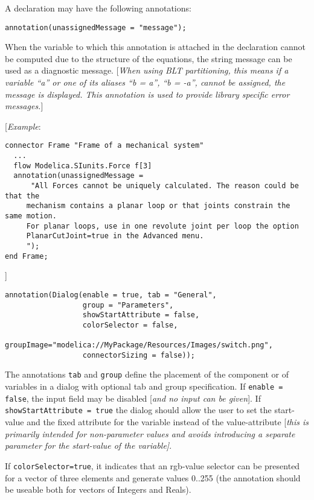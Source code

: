 A declaration may have the following annotations:
\begin{lstlisting}[language=modelica]
  annotation(unassignedMessage = "message");
\end{lstlisting}

When the variable to which this annotation is attached in the
declaration cannot be computed due to the structure of the equations,
the string message can be used as a diagnostic message. {[}\emph{When
using BLT partitioning, this means if a variable ``a'' or one of its
aliases ``b = a'', ``b = -a'', cannot be assigned, the message is
displayed. This annotation is used to provide library specific error
messages.}{]}

{[}\emph{Example}:

\begin{lstlisting}[language=modelica]
connector Frame "Frame of a mechanical system"
  ...
  flow Modelica.SIunits.Force f[3]
  annotation(unassignedMessage =
      "All Forces cannot be uniquely calculated. The reason could be that the
     mechanism contains a planar loop or that joints constrain the same motion.
     For planar loops, use in one revolute joint per loop the option
     PlanarCutJoint=true in the Advanced menu.
     ");
end Frame;
\end{lstlisting}
{]}
\begin{lstlisting}[language=modelica]
annotation(Dialog(enable = true, tab = "General",
                  group = "Parameters",
                  showStartAttribute = false,
                  colorSelector = false,
                  groupImage="modelica://MyPackage/Resources/Images/switch.png",
                  connectorSizing = false));
\end{lstlisting}

The annotations \lstinline!tab! and \lstinline!group! define the placement of
the component or of variables in a dialog with optional tab and group
specification. If \lstinline!enable = false!, the input field may
be disabled {[}\emph{and no input can be given}{]}. If
\lstinline!showStartAttribute = true! the dialog should allow the user to
set the start-value and the fixed attribute for the variable instead of
the value-attribute {[}\emph{this is primarily intended for
non-parameter values and avoids introducing a separate parameter for the
start-value of the variable{]}}.

If \lstinline!colorSelector=true!, it indicates that an rgb-value selector can be
presented for a vector of three elements and generate values 0..255 (the
annotation should be useable both for vectors of Integers and Reals).

